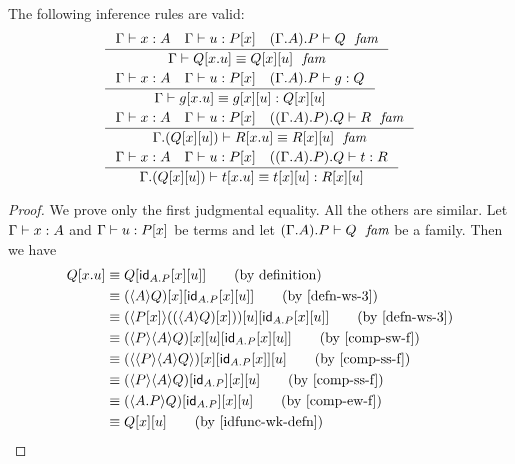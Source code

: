\begin{lem}
The following inference rules are valid:
\begin{align*}
& \inference
  {\jterm{\Gamma}{A}{x}
   \jterm{\Gamma}{\subst{x}{P}}{u}
   \jfam{{{\Gamma}{A}}{P}}{Q}}
  {\jfameq{\Gamma}{\subst{\ctxext{x}{u}}{Q}}{\subst{u}{{x}{Q}}}}\\
& \inference
  {\jterm{\Gamma}{A}{x}
   \jterm{\Gamma}{\subst{x}{P}}{u}
   \jterm{{{\Gamma}{A}}{P}}{Q}{g}}
  {\jtermeq{\Gamma}{\subst{u}{{x}{Q}}}{\subst{\ctxext{x}{u}}{g}}{\subst{u}{{x}{g}}}}\\
& \inference
  {\jterm{\Gamma}{A}{x}
   \jterm{\Gamma}{\subst{x}{P}}{u}
   \jfam{{{{\Gamma}{A}}{P}}{Q}}{R}}
  {\jfameq{{\Gamma}{\subst{u}{{x}{Q}}}}{\subst{\ctxext{x}{u}}{R}}{\subst{u}{{x}{R}}}}\\
& \inference
  {\jterm{\Gamma}{A}{x}
   \jterm{\Gamma}{\subst{x}{P}}{u}
   \jterm{{{{\Gamma}{A}}{P}}{Q}}{R}{t}}
  {\jtermeq{{\Gamma}{\subst{u}{{x}{Q}}}}{\subst{u}{{x}{R}}}{\subst{\ctxext{x}{u}}{t}}{\subst{u}{{x}{t}}}}
\end{align*}
\end{lem}

\begin{proof}
We prove only the first judgmental equality. All the others are similar.
Let $\jterm{\Gamma}{A}{x}$ and $\jterm{\Gamma}{\subst{x}{P}}{u}$
be terms and let $\jfam{{{\Gamma}{A}}{P}}{Q}$ be a family. Then we have
\begin{align*}
\subst{\ctxext{x}{u}}{Q} 
& \jdeq \subst{{u}{{x}{\idfunc[\ctxext{A}{P}]}}}{Q} \tag{by definition}\\
& \jdeq \subst{{u}{{x}{\idfunc[\ctxext{A}{P}]}}}{{x}{\ctxwk{A}{Q}}}\tag{by \autoref{defn-ws-3}}\\
& \jdeq \subst{{u}{{x}{\idfunc[\ctxext{A}{P}]}}}{{u}{\ctxwk{\subst{x}{P}}{\subst{x}{\ctxwk{A}{Q}}}}}\tag{by \autoref{defn-ws-3}}\\
& \jdeq \subst{{u}{{x}{\idfunc[\ctxext{A}{P}]}}}{{u}{{x}{\ctxwk{P}{{A}{Q}}}}}\tag{by \autoref{comp-sw-f}}\\
& \jdeq \subst{u}{{{x}{\idfunc[\ctxext{A}{P}]}}{{x}{\ctxwk{{P}{{A}{Q}}}}}}\tag{by \autoref{comp-ss-f}}\\
& \jdeq \subst{u}{{x}{{\idfunc[\ctxext{A}{P}]}{\ctxwk{P}{{A}{Q}}}}}\tag{by \autoref{comp-ss-f}}\\
& \jdeq \subst{u}{{x}{{\idfunc[\ctxext{A}{P}]}{\ctxwk{\ctxext{A}{P}}{Q}}}}\tag{by \autoref{comp-ew-f}}\\
& \jdeq \subst{u}{{x}{Q}}\tag{by \autoref{idfunc-wk-defn}}
\end{align*}
\end{proof}

